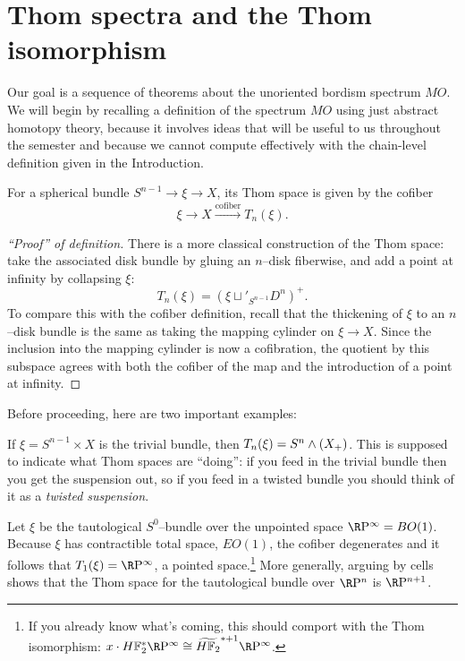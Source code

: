 \section{Thom spectra and the Thom isomorphism}\label{LectureThomSpectra}

Our goal is a sequence of theorems about the unoriented bordism spectrum $MO$.  We will begin by recalling a definition of the spectrum $MO$ using just abstract homotopy theory, because it involves ideas that will be useful to us throughout the semester and because we cannot compute effectively with the chain-level definition given in the Introduction.

\begin{definition}
For a spherical bundle $S^{n-1} \to \xi \to X$, its Thom space is given by the cofiber \[\xi \to X \xrightarrow{\text{cofiber}} T_n(\xi).\]
\end{definition}
\begin{proof}[``Proof'' of definition]
There is a more classical construction of the Thom space: take the associated disk bundle by gluing an $n$--disk fiberwise, and add a point at infinity by collapsing $\xi$: \[T_n(\xi) = (\xi \sqcup'_{S^{n-1}} D^n)^+.\]  To compare this with the cofiber definition, recall that the thickening of $\xi$ to an $n$--disk bundle is the same as taking the mapping cylinder on $\xi \to X$.  Since the inclusion into the mapping cylinder is now a cofibration, the quotient by this subspace agrees with both the cofiber of the map and the introduction of a point at infinity.
\end{proof}

Before proceeding, here are two important examples:
\begin{example}\label{TrivialBundleThomExample}
If $\xi = S^{n-1} \times X$ is the trivial bundle, then $T_n(\xi) = S^n \wedge (X_+)$.  This is supposed to indicate what Thom spaces are ``doing'': if you feed in the trivial bundle then you get the suspension out, so if you feed in a twisted bundle you should think of it as a \textit{twisted suspension}.
\end{example}

\begin{example}\label{RPnThomExample}
Let $\xi$ be the tautological $S^0$--bundle over the unpointed space $\RP^\infty = BO(1)$.  Because $\xi$ has contractible total space, $EO(1)$, the cofiber degenerates and it follows that $T_1(\xi) = \RP^\infty$, a pointed space.\footnote{If you already know what's coming, this should comport with the Thom isomorphism: $x \cdot \HFtwo^* \RP^\infty \cong \widetilde{\HFtwo}^{* + 1} \RP^\infty$.}  More generally, arguing by cells shows that the Thom space for the tautological bundle over $\RP^n$ is $\RP^{n+1}$.
\end{example}

